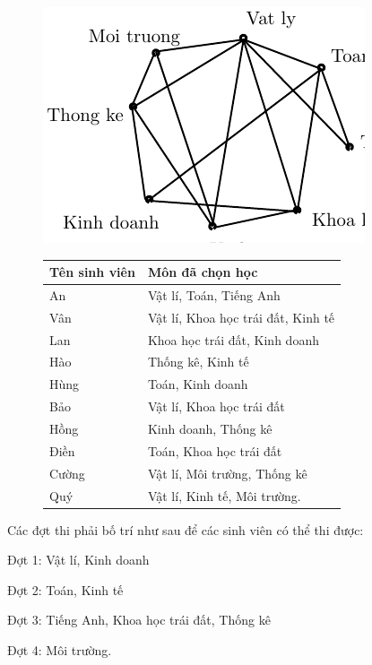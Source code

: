 \documentclass[11pt]{article}
\begin{document}
\begin{shortanswer}[title={\relax}, rearrange=no]
\begin{question}
\begin{answer}
\begin{figure}[!ht]
\begin{minipage}[b]{5cm}
\centering
\includegraphics[scale =1]{kithi1}
\caption{}\label{fig:hinh4}
\end{minipage}
\hfill
\begin{minipage}[b]{9cm}
\begin{tabular}{ l  l }
 Tên sinh viên & Môn đã chọn học \\
\hline
 An & Vật lí, Toán, Tiếng Anh \\
Vân& Vật lí, Khoa học trái đất, Kinh tế\\
Lan & Khoa học trái đất, Kinh doanh\\
Hào &Thống kê, Kinh tế\\
Hùng&Toán, Kinh doanh\\
Bảo&Vật lí, Khoa học trái đất\\
Hồng& Kinh doanh, Thống kê\\
Điền &Toán, Khoa học trái đất\\
Cường&Vật lí, Môi trường, Thống kê\\
Quý&Vật lí, Kinh tế, Môi trường.
\end{tabular}
\caption{}\label{fig:hinh00}
\end{minipage}
\end{figure}
Các đợt thi phải bố trí như sau để các sinh viên có thể thi được:

Đợt 1: Vật lí, Kinh doanh

Đợt 2: Toán, Kinh tế

Đợt 3: Tiếng Anh, Khoa học trái đất, Thống kê

Đợt 4: Môi trường.
\end{answer}
\end{question}


\end{shortanswer}
\end{document}
